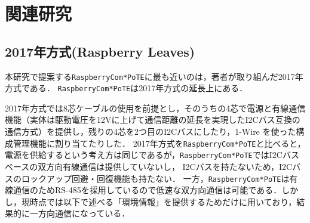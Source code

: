 



\section{関連研究}
\vspace{-0.5zh}
\label{sec:03relatedworks}

\subsection{2017年方式(Raspberry Leaves)}
\vspace{-0.5zh}

本研究で提案する{\tt Raspberry\-Com*PoTE}に最も近いのは，著者が取り組んだ2017年方式である．
{\tt Raspberry\-Com*PoTE}は2017年方式の延長上にある．

2017年方式では8芯ケーブルの使用を前提とし，そのうちの4芯で電源と有線通信機能（実体は駆動電圧を12Vに上げて通信距離の延長を実現したI2Cバス互換の通信方式）を提供し，残りの4芯を2つ目のI2Cバスにしたり，1-Wire を使った構成管理機能に割り当てたりした．
2017年方式を{\tt Raspberry\-Com*PoTE}と比べると，電源を供給するという考え方は同じであるが，{\tt Raspberry\-Com*PoTE}ではI2Cバスベースの双方向有線通信は提供していないし，
I2Cバスを持たないため，I2Cバスのロックアップ回避・回復機能も持たない．
一方，{\tt Raspberry\-Com*PoTE}は有線通信のためRS-485を採用しているので低速な双方向通信は可能である．しかし，現時点では以下で述べる「環境情報」を提供するためだけに用いており，結果的に一方向通信になっている．


